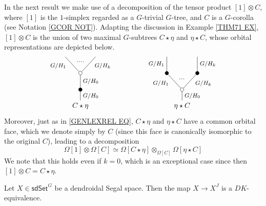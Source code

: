 \documentclass[a4paper,10pt
,draft
]{article}%
\begin{document}
In the next result we make use of a decomposition of the tensor product $[1] \otimes C$,
where $[1]$ is the $1$-simplex regarded as a $G$-trivial $G$-tree, and $C$ is a $G$-corolla 
(see Notation \ref{GCOR NOT}). Adapting the discussion
in Example \ref{THM71 EX}, $[1] \otimes C$ is the union of two maximal $G$-subtrees $C \star \eta$ and $\eta \star C$,
whose orbital representations are depicted below.
\[
\begin{tikzpicture}
[grow=up,auto,level distance=2.3em,every node/.style = {font=\footnotesize},dummy/.style={circle,draw,inner sep=0pt,minimum size=1.75mm}]
	\node at (0,0) [font=\normalsize] {$C \star \eta$}
		child{node [dummy,fill=black] {}
			child{node [dummy] {}
				child{
				edge from parent node [swap,near end] {$G/H_k$} node [name=Kn] {}}
				child{
				edge from parent node [near end] {$G/H_1$}
node [name=Kone,swap] {}}
			edge from parent node [swap] {$G/H_0$}}
		edge from parent node [swap] {$G/H_0$}};
		\draw [dotted,thick] (Kone) -- (Kn) ;
	\node at (5,0) [font=\normalsize] {$\eta \star C$}
		child{node [dummy] {}
			child{node [dummy,fill=black] {}
				child{
				edge from parent node [swap] {$G/H_k$}}
			edge from parent node [swap,near end] {$G/H_k$} node [name=Kn] {}}
			child{node [dummy,fill=black] {}
				child{
				edge from parent node {$G/H_1$}}
			edge from parent node [near end] {$G/H_1$}
node [name=Kone,swap] {}}
		edge from parent node [swap] {$G/H_0$}
		};
		\draw [dotted,thick] (Kone) -- (Kn) ;
\end{tikzpicture}
\]
Moreover, just as in \eqref{GENLEXREL EQ}, 
$C \star \eta$ and $\eta \star C$ have a common orbital face, which we denote simply by $C$
(since this face is canonically isomorphic to the original $C$),
leading to a decomposition
\[
\Omega[1] \otimes \Omega[C]
	\simeq
\Omega[C \star \eta] \otimes_{\Omega[C]} \Omega[\eta \star C]
\]
We note that this holds even if $k=0$, 
which is an exceptional case since then
$[1] \otimes C = C \star \eta$.


\begin{proposition}\label{JDDK PROP}
	Let $X\in \mathsf{sdSet}^G$ be a dendroidal Segal space. 
	Then the map $X \to X^{J}$ is a $DK$-equivalence.
\end{proposition}
\end{document}

